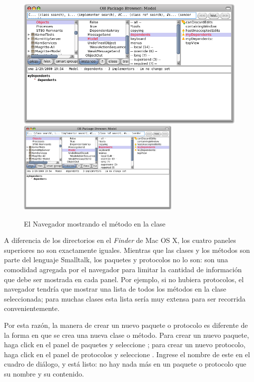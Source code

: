 \documentclass[spanish,a4paper,10pt,twoside]{book}
\begin{document}
\begin{figure}[htbp]
   \centering
   \ifluluelse
	   {\includegraphics[width=\textwidth]{SystemBrowserMyDependents}}
	   {\includegraphics[width=0.7\textwidth]{SystemBrowserMyDependents}}
   \caption{El Navegador mostrando el m\'etodo  en la clase 
   }
\end{figure}

A diferencia de los directorios en el \emph{Finder} de Mac OS X, los cuatro paneles superiores no son exactamente iguales.
Mientras que las clases y los m\'etodos son parte del lenguaje Smalltalk, los paquetes y protocolos no lo son: son una comodidad agregada por el navegador para limitar la cantidad de informaci\'on que debe ser mostrada en cada panel. Por ejemplo, si no hubiera protocolos, el navegador tendr\'ia que mostrar una lista de todos los m\'etodos en la clase seleccionada; para muchas clases esta lista ser\'ia muy extensa para ser recorrida convenientemente.

Por esta raz\'on, la manera de crear un nuevo paquete o protocolo es diferente de la forma en que se crea una nueva clase o m\'etodo. Para crear un nuevo paquete, haga click en el panel de paquetes y seleccione ; para crear un nuevo protocolo, haga click en el panel de protocolos y seleccione .
Ingrese el nombre de este en el cuadro de di\'alogo, y est\'a listo: no hay nada m\'as en un paquete o protocolo que su nombre y su contenido.
\end{document}

